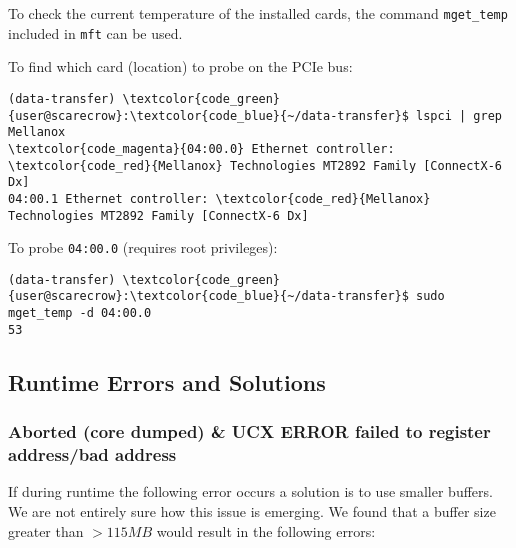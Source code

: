 \documentclass[a4paper,onecolumn]{article}
\begin{document}
To check the current temperature of the installed cards, the command \verb|mget_temp| included in \verb|mft| can be used.

\vspace{5mm} %
To find which card (location) to probe on the PCIe bus:

\begin{Verbatim}[commandchars=\\\{\}]
(data-transfer) \textcolor{code_green}{user@scarecrow}:\textcolor{code_blue}{~/data-transfer}$ lspci | grep Mellanox
\textcolor{code_magenta}{04:00.0} Ethernet controller: \textcolor{code_red}{Mellanox} Technologies MT2892 Family [ConnectX-6 Dx]
04:00.1 Ethernet controller: \textcolor{code_red}{Mellanox} Technologies MT2892 Family [ConnectX-6 Dx]
\end{Verbatim}

\vspace{5mm} %
To probe \verb|04:00.0| (requires root privileges):

\begin{Verbatim}[commandchars=\\\{\}]
(data-transfer) \textcolor{code_green}{user@scarecrow}:\textcolor{code_blue}{~/data-transfer}$ sudo mget_temp -d 04:00.0
53
\end{Verbatim}


\subsection{Runtime Errors and Solutions}

\subsubsection{Aborted (core dumped) & UCX ERROR failed to register address/bad address}

If during runtime the following error occurs a solution is to use smaller buffers. We are not entirely sure how this issue is emerging. We found that a buffer size greater than \textcolor{code_magenta}{$>115MB$} would result in the following errors:
\end{document}
